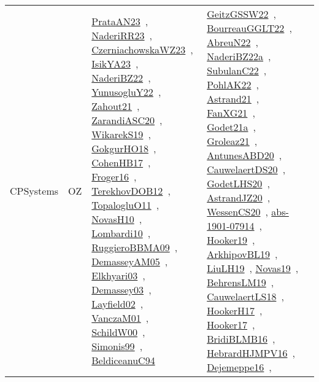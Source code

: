 {\begin{longtable}{lp{3cm}>{\raggedright\arraybackslash}p{6cm}>{\raggedright\arraybackslash}p{6cm}>{\raggedright\arraybackslash}p{8cm}}
CPSystems & OZ & \href{works/PrataAN23.pdf}{PrataAN23}~\cite{PrataAN23}, \href{works/NaderiRR23.pdf}{NaderiRR23}~\cite{NaderiRR23}, \href{works/CzerniachowskaWZ23.pdf}{CzerniachowskaWZ23}~\cite{CzerniachowskaWZ23}, \href{works/IsikYA23.pdf}{IsikYA23}~\cite{IsikYA23}, \href{works/NaderiBZ22.pdf}{NaderiBZ22}~\cite{NaderiBZ22}, \href{works/YunusogluY22.pdf}{YunusogluY22}~\cite{YunusogluY22}, \href{works/Zahout21.pdf}{Zahout21}~\cite{Zahout21}, \href{works/ZarandiASC20.pdf}{ZarandiASC20}~\cite{ZarandiASC20}, \href{works/WikarekS19.pdf}{WikarekS19}~\cite{WikarekS19}, \href{works/GokgurHO18.pdf}{GokgurHO18}~\cite{GokgurHO18}, \href{works/CohenHB17.pdf}{CohenHB17}~\cite{CohenHB17}, \href{works/Froger16.pdf}{Froger16}~\cite{Froger16}, \href{works/TerekhovDOB12.pdf}{TerekhovDOB12}~\cite{TerekhovDOB12}, \href{works/TopalogluO11.pdf}{TopalogluO11}~\cite{TopalogluO11}, \href{works/NovasH10.pdf}{NovasH10}~\cite{NovasH10}, \href{works/Lombardi10.pdf}{Lombardi10}~\cite{Lombardi10}, \href{works/RuggieroBBMA09.pdf}{RuggieroBBMA09}~\cite{RuggieroBBMA09}, \href{works/DemasseyAM05.pdf}{DemasseyAM05}~\cite{DemasseyAM05}, \href{works/Elkhyari03.pdf}{Elkhyari03}~\cite{Elkhyari03}, \href{works/Demassey03.pdf}{Demassey03}~\cite{Demassey03}, \href{works/Layfield02.pdf}{Layfield02}~\cite{Layfield02}, \href{works/VanczaM01.pdf}{VanczaM01}~\cite{VanczaM01}, \href{works/SchildW00.pdf}{SchildW00}~\cite{SchildW00}, \href{works/Simonis99.pdf}{Simonis99}~\cite{Simonis99}, \href{works/BeldiceanuC94.pdf}{BeldiceanuC94}~\cite{BeldiceanuC94} & \href{works/GeitzGSSW22.pdf}{GeitzGSSW22}~\cite{GeitzGSSW22}, \href{works/BourreauGGLT22.pdf}{BourreauGGLT22}~\cite{BourreauGGLT22}, \href{works/AbreuN22.pdf}{AbreuN22}~\cite{AbreuN22}, \href{works/NaderiBZ22a.pdf}{NaderiBZ22a}~\cite{NaderiBZ22a}, \href{works/SubulanC22.pdf}{SubulanC22}~\cite{SubulanC22}, \href{works/PohlAK22.pdf}{PohlAK22}~\cite{PohlAK22}, \href{works/Astrand21.pdf}{Astrand21}~\cite{Astrand21}, \href{works/FanXG21.pdf}{FanXG21}~\cite{FanXG21}, \href{works/Godet21a.pdf}{Godet21a}~\cite{Godet21a}, \href{works/Groleaz21.pdf}{Groleaz21}~\cite{Groleaz21}, \href{works/AntunesABD20.pdf}{AntunesABD20}~\cite{AntunesABD20}, \href{works/CauwelaertDS20.pdf}{CauwelaertDS20}~\cite{CauwelaertDS20}, \href{works/GodetLHS20.pdf}{GodetLHS20}~\cite{GodetLHS20}, \href{works/AstrandJZ20.pdf}{AstrandJZ20}~\cite{AstrandJZ20}, \href{works/WessenCS20.pdf}{WessenCS20}~\cite{WessenCS20}, \href{works/abs-1901-07914.pdf}{abs-1901-07914}~\cite{abs-1901-07914}, \href{works/Hooker19.pdf}{Hooker19}~\cite{Hooker19}, \href{works/ArkhipovBL19.pdf}{ArkhipovBL19}~\cite{ArkhipovBL19}, \href{works/LiuLH19.pdf}{LiuLH19}~\cite{LiuLH19}, \href{works/Novas19.pdf}{Novas19}~\cite{Novas19}, \href{works/BehrensLM19.pdf}{BehrensLM19}~\cite{BehrensLM19}, \href{works/CauwelaertLS18.pdf}{CauwelaertLS18}~\cite{CauwelaertLS18}, \href{works/HookerH17.pdf}{HookerH17}~\cite{HookerH17}, \href{works/Hooker17.pdf}{Hooker17}~\cite{Hooker17}, \href{works/BridiBLMB16.pdf}{BridiBLMB16}~\cite{BridiBLMB16}, \href{works/HebrardHJMPV16.pdf}{HebrardHJMPV16}~\cite{HebrardHJMPV16}, \href{works/Dejemeppe16.pdf}{Dejemeppe16}~\cite{Dejemeppe16}, 
\end{longtable}}
